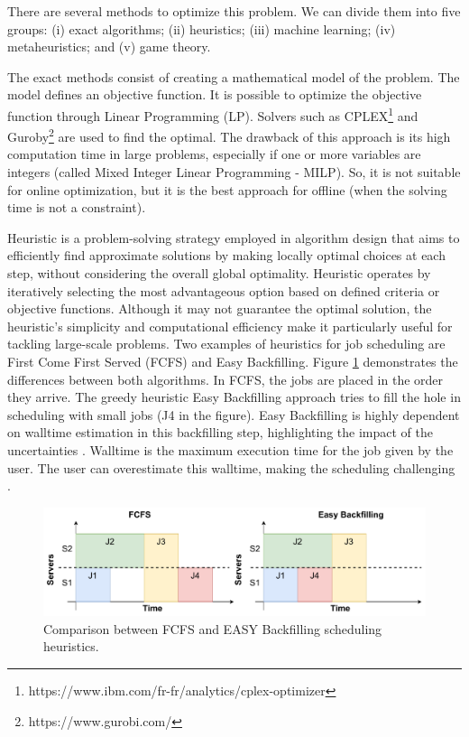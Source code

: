 There are several methods to optimize this problem. We can divide them into five groups: (i) exact algorithms; (ii) heuristics; (iii) machine learning; (iv) metaheuristics; and (v) game theory.

The exact methods consist of creating a mathematical model of the problem. The model defines an objective function. It is possible to optimize the objective function through Linear Programming (LP). Solvers such as CPLEX\footnote{https://www.ibm.com/fr-fr/analytics/cplex-optimizer} and Guroby\footnote{https://www.gurobi.com/} are used to find the optimal. The drawback of this approach is its high computation time in large problems, especially if one or more variables are integers (called Mixed Integer Linear Programming - MILP). So, it is not suitable for online optimization, but it is the best approach for offline (when the solving time is not a constraint). 

Heuristic is a problem-solving strategy employed in algorithm design that aims to efficiently find approximate solutions by making locally optimal choices at each step, without considering the overall global optimality. Heuristic operates by iteratively selecting the most advantageous option based on defined criteria or objective functions. Although it may not guarantee the optimal solution, the heuristic's simplicity and computational efficiency make it particularly useful for tackling large-scale problems. Two examples of heuristics for job scheduling are First Come First Served (FCFS) and Easy Backfilling. Figure \ref{fig:backfilling} demonstrates the differences between both algorithms. In FCFS, the jobs are placed in the order they arrive. The greedy heuristic Easy Backfilling approach tries to fill the hole in scheduling with small jobs (J4 in the figure). Easy Backfilling is highly dependent on walltime estimation in this backfilling step, highlighting the impact of the uncertainties \cite{srinivasan2002characterization, takizawa2020effect}. Walltime is the maximum execution time for the job given by the user. The user can overestimate this walltime, making the scheduling challenging \cite{takizawa2020effect}.

\begin{figure}[!htb]
    \centering
    \includegraphics[scale=0.6]{Images/Related_works/backfilling.pdf}
    \caption{Comparison between FCFS and EASY Backfilling scheduling heuristics.}
    \label{fig:backfilling}
\end{figure}

